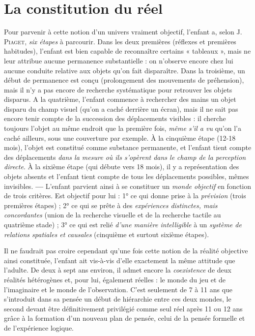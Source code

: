 \section{La constitution du réel}%
Pour parvenir à cette notion
d’un univers vraiment objectif, l'enfant a, selon J. \textsc{Piaget}, {\it six
étapes} à parcourir. Dans les deux premières (réflexes et premières habitudes),
l’enfant est bien capable de reconnaître certains « tableaux »,
mais ne leur attribue aucune permanence substantielle : on n’observe
encore chez lui aucune conduite relative aux objets qu’on fait disparaître.
Dans la troisième, un début de permanence est conçu (prolongement
des mouvements de préhension), mais il n’y a pas encore de
recherche systématique pour retrouver les objets disparus. A la quatrième,
l’enfant commence à rechercher des mains un objet disparu
du champ visuel (qu’on a caché derrière un écran), mais il ne sait pas
encore tenir compte de la succession des déplacements visibles : il
cherche toujours l’objet au même endroit que la première fois, {\it même
s’il a vu} qu’on l’a caché ailleurs, sous une couverture par exemple. À
la cinquième étape (12-18 mois), l’objet est constitué comme substance
permanente, et l'enfant tient compte des déplacements {\it dans
la mesure où ils s’opèrent dans le champ de la perception directe}. À la
sixième étape (qui débute vers 18 mois), il y a représentation des
objets absents et l’enfant tient compte de tous les déplacements possibles,
mêmes invisibles. {\bf —} L'enfant parvient ainsi à se constituer un
{\it monde objectif} en fonction de trois critères. Est objectif pour lui :
1° ce qui donne prise à la {\it prévision} (trois premières étapes) ; 2° ce qui
se prête à des {\it expériences distinctes, mais concordantes} (union de la
recherche visuelle et de la recherche tactile au quatrième stade) ;
3° ce qui est relié {\it d’une manière intelligible} à un {\it système de relations
spatiales et causales} (cinquième et surtout sixième étapes).

Il ne faudrait pas croire cependant qu’une fois cette notion de la
réalité objective ainsi constituée, l’enfant ait vis-à-vis d’elle exactement
la même attitude que l’adulte. De deux à sept ans environ, il
admet encore la {\it coexistence} de deux réalités hétérogènes et, pour lui,
également réelles : le monde du jeu et de l'imaginaire et le monde
de l'observation. C’est seulement de 7 à 11 ans que s’introduit dans
sa pensée un début de hiérarchie entre ces deux mondes, le second
devant être définitivement privilégié comme seul réel après 11 ou
12 ans grâce à la formation d’un nouveau plan de pensée, celui de
la pensée formelle et de l'expérience logique.

